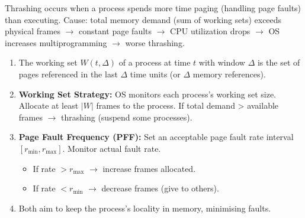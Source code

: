 \documentclass[11pt]{article}
\newcommand{\cle}[1]{{\popxbold\color{popdark}#1}}
\begin{document}
\begin{definition}[Thrashing]
\cle{Thrashing} occurs when a process spends more time paging (handling page faults) than executing. Cause: total memory demand (sum of working sets) exceeds physical frames $\rightarrow$ constant page faults $\rightarrow$ CPU utilization drops $\rightarrow$ OS increases multiprogramming $\rightarrow$ worse thrashing.
\end{definition}

\begin{methode}
\begin{enumerate}
\item The \cle{working set} $W(t, \Delta)$ of a process at time $t$ with window $\Delta$ is the set of pages referenced in the last $\Delta$ time units (or $\Delta$ memory references).
\item \textbf{Working Set Strategy:} OS monitors each process's working set size. Allocate at least $|W|$ frames to the process. If total demand > available frames $\rightarrow$ \cle{thrashing} (suspend some processes).
\item \textbf{Page Fault Frequency (PFF):} Set an acceptable page fault rate interval $[r_{\min}, r_{\max}]$. Monitor actual fault rate.
\begin{itemize}
\item If rate $> r_{\max}$ $\rightarrow$ increase frames allocated.
\item If rate $< r_{\min}$ $\rightarrow$ decrease frames (give to others).
\end{itemize}
\item Both aim to keep the process's \cle{locality} in memory, minimising faults.
\end{enumerate}
\end{methode}
\end{document}
